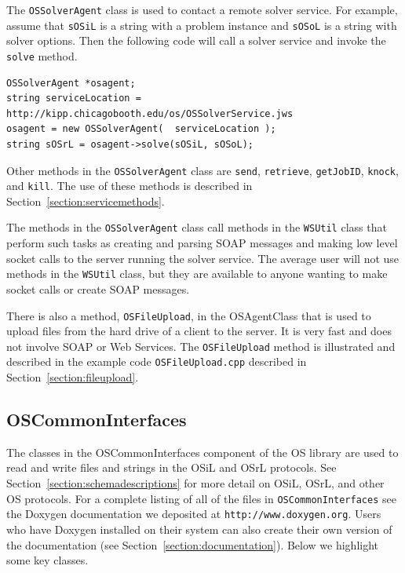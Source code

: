 \documentclass[11pt]{article}
\renewcommand{\_}{{\char"5F}}
\renewcommand{\{}{{\char"7B}}
\renewcommand{\}}{{\char"7D}}
\renewcommand{\^}{{\char"0D}}
\renewcommand{\'}{{\char"0D}}
\newcommand{\UrlDoxygen}{http://www.doxygen.org}
\begin{document}
\begin{enumerate}[Step 1:]
The {\tt OSSolverAgent} class is used to contact a remote solver service.  For example, assume that {\tt sOSiL}
is a string with a problem instance and {\tt sOSoL} is a string with solver options. Then the following code
will call a solver service and invoke the {\tt solve} method.
\begin{verbatim}
OSSolverAgent *osagent;
string serviceLocation = http://kipp.chicagobooth.edu/os/OSSolverService.jws
osagent = new OSSolverAgent(  serviceLocation );
string sOSrL = osagent->solve(sOSiL, sOSoL);
\end{verbatim}
Other methods in the {\tt OSSolverAgent} class are {\tt send}, {\tt retrieve}, {\tt getJobID}, {\tt knock}, and {\tt kill}.  The use of these methods is described in Section~\ref{section:servicemethods}.



The methods in the {\tt OSSolverAgent} class call methods in the {\tt WSUtil} class that perform such tasks as creating and parsing SOAP messages and making low level socket calls to the server running the solver service. The average user will not use methods in the {\tt WSUtil} class, but they are available to anyone wanting to make socket calls or create SOAP messages.

There is also a method, {\tt OSFileUpload}, in the OSAgentClass that is used to upload files from the hard drive of a client to the server. It is very fast and does not involve SOAP or Web Services. The {\tt OSFileUpload}  method is illustrated and described in the example code {\tt OSFileUpload.cpp} described in Section~\ref{section:fileupload}.

\subsection{OSCommonInterfaces}

The classes in the OSCommonInterfaces component of the OS library are used to read and write files and strings
in the OSiL and OSrL protocols. See Section~\ref{section:schemadescriptions} for more detail on OSiL, OSrL,
and other OS protocols. For a complete listing of all of the files in {\tt OSCommonInterfaces} see the 
Doxygen documentation we deposited at {\tt\UrlDoxygen}. Users who have Doxygen installed on their system
can also create their own version of the documentation (see Section~\ref{section:documentation}). Below we highlight 
some key classes.






\end{enumerate}
\end{document}
